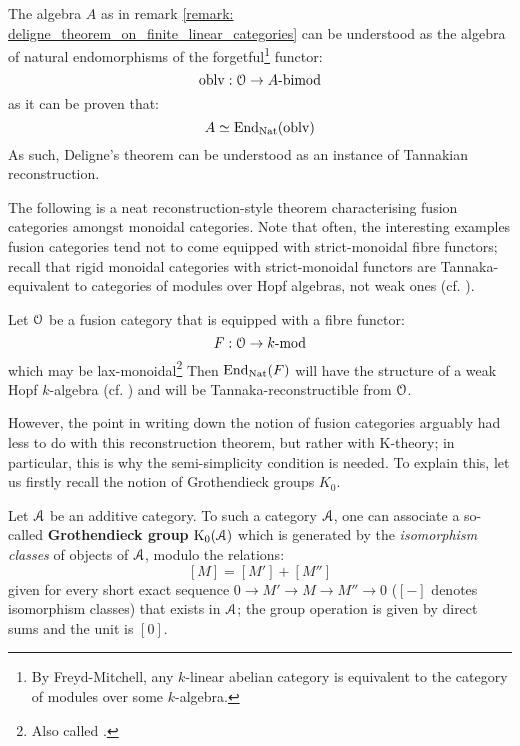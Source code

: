             \begin{remark}
                The algebra $A$ as in remark \ref{remark: deligne_theorem_on_finite_linear_categories} can be understood as the algebra of natural endomorphisms of the forgetful\footnote{By Freyd-Mitchell, any $k$-linear abelian category is equivalent to the category of modules over some $k$-algebra.} functor:
                    $$\mathrm{oblv}: \mathcal{O} \to A\text{-}\mathrm{bimod}$$
                as it can be proven that:
                    $$A \simeq \mathrm{End}_{\mathrm{Nat}}(\mathrm{oblv})$$
                As such, Deligne's theorem can be understood as an instance of Tannakian reconstruction. 
            \end{remark}
            The following is a neat reconstruction-style theorem characterising fusion categories amongst monoidal categories. Note that often, the interesting examples fusion categories tend not to come equipped with strict-monoidal fibre functors; recall that rigid monoidal categories with strict-monoidal functors are Tannaka-equivalent to categories of modules over Hopf algebras, not weak ones (cf. \cite[Chapter 5]{EGNO}). 
            \begin{theorem}
                Let $\mathcal{O}$ be a fusion category that is equipped with a fibre functor:
                    $$F: \mathcal{O} \to k\text{-}\mathrm{mod}$$
                which may be lax-monoidal\footnote{Also called .} Then $\mathrm{End}_{\mathrm{Nat}}(F)$ will have the structure of a weak Hopf $k$-algebra (cf. \cite[Section 7.23]{EGNO}) and will be Tannaka-reconstructible from $\mathcal{O}$.
            \end{theorem}
            However, the point in writing down the notion of fusion categories arguably had less to do with this reconstruction theorem, but rather with K-theory; in particular, this is why the semi-simplicity condition is needed. To explain this, let us firstly recall the notion of Grothendieck groups $K_0$.
            \begin{definition} 
                Let $\mathcal{A}$ be an additive category. To such a category $\mathcal{A}$, one can associate a so-called \textbf{Grothendieck group} $\mathrm{K}_0(\mathcal{A})$ which is generated by the \textit{isomorphism classes} of objects of $\mathcal{A}$, modulo the relations:
                    $$[M] = [M'] + [M'']$$
                given for every short exact sequence $0 \to M' \to M \to M'' \to 0$ ($[-]$ denotes isomorphism classes) that exists in $\mathcal{A}$; the group operation is given by direct sums and the unit is $[0]$. 
            \end{definition}
